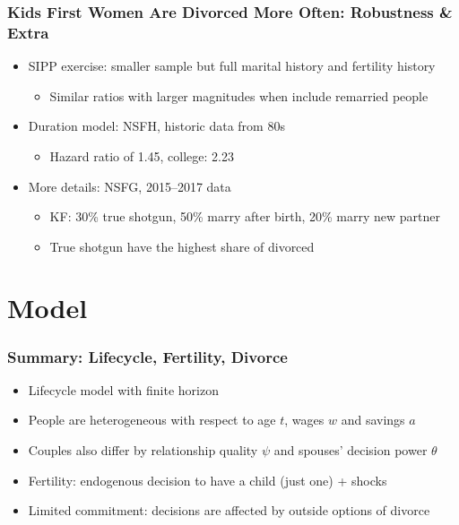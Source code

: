 \documentclass[aspectratio=169]{beamer}
\let\olditem\item
\renewcommand{\item}{%
\olditem\vspace{\fill}}
\begin{document}
\begin{frame}
\frametitle{Kids First Women Are Divorced More Often: Robustness \& Extra}
\begin{itemize}
\item SIPP exercise: smaller sample but full marital history and fertility history
\begin{itemize}
\item Similar ratios with larger magnitudes when include remarried people
\end{itemize}
\item Duration model: NSFH, historic data from 80s
\begin{itemize}
\item Hazard ratio of 1.45, college: 2.23
\end{itemize}
\item More details: NSFG, 2015--2017 data
\begin{itemize}
\item KF: 30\% true shotgun, 50\% marry after birth, 20\% marry new partner
\item True shotgun have the highest share of divorced
\end{itemize}
\end{itemize}
\end{frame}
%
%



\section{Model}
\begin{frame}
\frametitle{Summary: Lifecycle, Fertility, Divorce}
\begin{itemize}
\item Lifecycle model with finite horizon
\item People are heterogeneous with respect to age $t$, wages $w$ and savings $a$
\item Couples also differ by relationship quality $\psi$ and spouses' decision power $\theta$
\item Fertility: endogenous decision to have a child (just one) + shocks
\item Limited commitment: decisions are affected by outside options of divorce
\end{itemize}
\end{frame}
\end{document}
